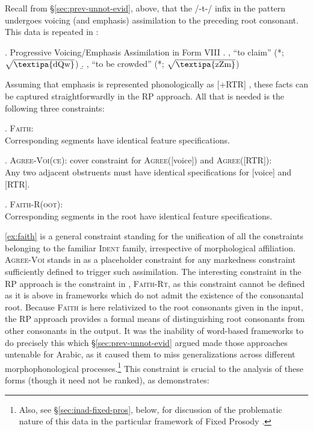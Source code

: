 \documentclass[12pt,twoside,letterpaper]{article}
\begin{document}
Recall from \S{\ref{sec:prev-unnot-evid}}, above, that the /-t-/ infix in the {\em {}} pattern undergoes voicing (and emphasis) assimilation to the preceding root consonant. This data is repeated in \Next:


\ex. Progressive Voicing/Emphasis Assimilation in Form VIII \citep[p. 74]{erwin04}
\a. , ``to claim'' (*; $\sqrt{\textrm{\textipa{dQw}}}$)
\b. , ``to be crowded'' (*; $\sqrt{\textrm{\textipa{zZm}}}$)

Assuming that emphasis is represented phonologically as [+RTR] \citep{davis95}, these facts can be captured straightforwardly in the RP approach. All that is needed is the following three constraints:

\ex. \label{ex:faith}\textsc{Faith}:\\Corresponding segments have identical feature specifications.

\ex. \textsc{Agree-Voi(ce)}: cover constraint for \textsc{Agree}([voice]) and \textsc{Agree}([RTR]):\\Any two adjacent obstruents must have identical specifications for [voice] and [RTR].

\ex. \label{ex:faith-rt}\textsc{Faith-R(oot)}:\\Corresponding segments in the root have identical feature specifications.

\ref{ex:faith} is a general constraint standing for the unification of all the constraints belonging to the familiar \textsc{Ident} family, irrespective of morphological affiliation. \textsc{Agree-Voi} stands in as a placeholder constraint for any markedness constraint sufficiently defined to trigger such assimilation. The interesting constraint in the RP approach is the constraint in \Last, \textsc{Faith-Rt}, as this constraint cannot be defined as it is above in frameworks which do not admit the existence of the consonantal root. Because \textsc{Faith} is here relativized to the root consonants given in the input, the RP approach provides a formal means of distinguishing root consonants from other consonants in the output. It was the inability of word-based frameworks to do precisely this which \S{\ref{sec:prev-unnot-evid}} argued made those approaches untenable for Arabic, as it caused them to miss generalizations across different morphophonological processes.\footnote{Also, see \S{\ref{sec:inad-fixed-pros}}, below, for discussion of the problematic nature of this data in the particular framework of Fixed Prosody \citep{ussishkin00,buckley03,ussishkin05}.} This constraint is crucial to the analysis of these forms (though it need not be ranked), as \Next demonstrates:
\end{document}
